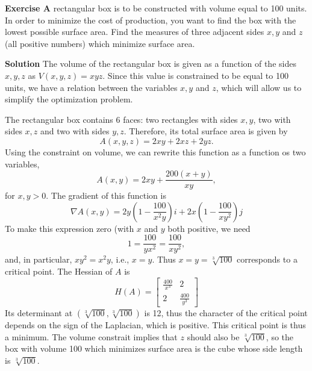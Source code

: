\documentclass[12pt,oneside]{exam}
\newenvironment{exercise}[1]{\vspace{.1in}\noindent\textbf{Exercise #1 \hspace{.05em}}}{}
\newenvironment{newsolution}{\vspace{.1in}\noindent\textbf{Solution \hspace{.05em}}}{}
\begin{document}
\begin{exercise}{6}
A rectangular box is to be constructed with volume equal to 100 units. In order to minimize the cost of production, you want to find the box with the lowest possible surface area. Find the measures of three adjacent sides $x,y$ and $z$ (all positive numbers) which minimize surface area.
\end{exercise} 

\begin{newsolution}
The volume of the rectangular box is given as a function of the sides $x,y,z$ as $V(x,y,z)=xyz$. Since this value is constrained to be equal to 100 units, we have a relation between the variables $x,y$ and $z$, which will allow us to simplify the optimization problem. 

The rectangular box contains 6 faces: two rectangles with sides $x,y$, two with sides $x,z$ and two with sides $y,z$. Therefore, its total surface area is given by 
\begin{equation*}
A(x,y,z)=2xy+2xz+2yz.
\end{equation*} 
Using the constraint on volume, we can rewrite this function as a function os two variables, 
\begin{equation*}
A(x,y)=2xy+\frac{200(x+y)}{xy}, 
\end{equation*}
for $x,y >0$. 
The gradient of this function is
\begin{equation*}
\nabla A (x,y) = 2y\left( 1 -\frac{100}{x^2y} \right)i + 2x\left( 1 -\frac{100}{xy^2} \right)j
\end{equation*}
To make this expression zero (with $x$ and $y$ both positive, we need 
\begin{equation*}
1=\frac{100}{yx^2} = \frac{100}{xy^2},
\end{equation*}
and, in particular, $xy^2=x^2y$, i.e., $x=y$. Thus $x=y=\sqrt[3]{100}$ corresponds to a critical point. The Hessian of $A$ is
\begin{equation*}
H(A)=\left[
\begin{matrix}
\frac{400}{x^3} & 2 \\
2 & \frac{400}{y^3}
\end{matrix}
\right]
\end{equation*}
Its determinant at $(\sqrt[3]{100}, \sqrt[3]{100})$ is 12, thus the character of the critical point depends on the sign of the Laplacian, which is positive. This critical point is thus a minimum. The volume constrait implies that $z$ should also be $\sqrt[3]{100}$, so the box with volume 100 which minimizes surface area is the cube whose side length is $\sqrt[3]{100}$. 
\end{newsolution}
\end{document}
